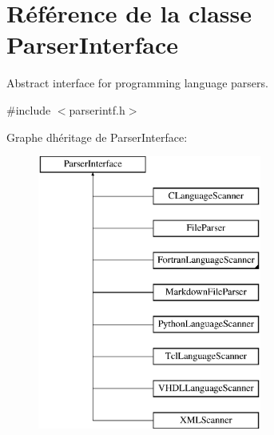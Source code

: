\hypertarget{class_parser_interface}{}\section{Référence de la classe Parser\+Interface}
\label{class_parser_interface}


Abstract interface for programming language parsers.  




{\ttfamily \#include $<$parserintf.\+h$>$}

Graphe d\textquotesingle{}héritage de Parser\+Interface\+:\begin{figure}[H]
\begin{center}
\leavevmode
\includegraphics[height=9.000000cm]{class_parser_interface}
\end{center}
\end{figure}
